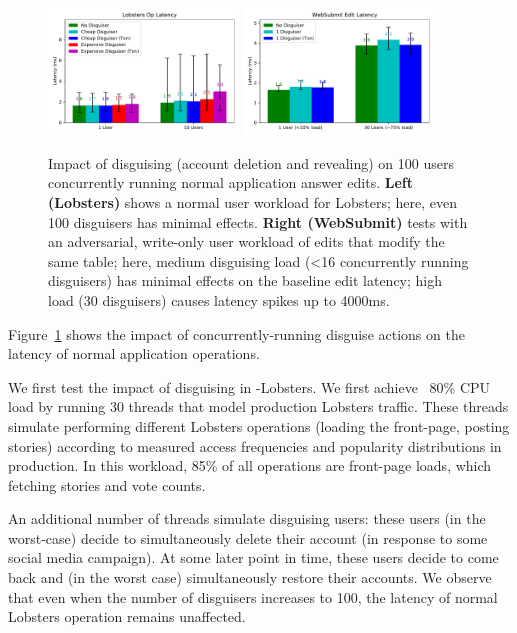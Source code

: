 \begin{figure}[t!]
    \centering
        \includegraphics[width=0.45\textwidth]{figs/lobsters_concurrent_results}
        \includegraphics[width=0.45\textwidth]{figs/websubmit_concurrent_results}
    \caption{Impact of disguising (account deletion and revealing) on 100 users concurrently running
    normal application answer edits.
    \textbf{Left (Lobsters)} shows a normal user workload for Lobsters; here, even 100 disguisers
    has minimal effects.
    \textbf{Right (WebSubmit)} tests with an adversarial,
    write-only user workload of edits that modify the same table; here, medium disguising load (<16
    concurrently running disguisers) has minimal effects on the baseline edit latency; high load (30
    disguisers) causes latency spikes up to 4000ms.
    }
    \label{fig:concurrent}
\end{figure}

Figure~\ref{fig:concurrent} shows the impact of concurrently-running disguise actions on the latency
of normal application operations.

We first test the impact of disguising in \sys-Lobsters. We first achieve ~80\% CPU load by running
30 threads that model production Lobsters traffic. These threads simulate performing different
Lobsters operations (\eg loading the front-page, posting stories) according to measured access
frequencies and popularity distributions in production. In this workload, 85\% of all
operations are front-page loads, which fetching stories and vote counts.

An additional number of threads simulate disguising users: these users (in the worst-case) decide to
simultaneously delete their account (\eg in response to some social media campaign). At some later
point in time, these users decide to come back and (in the worst case) simultaneously restore their
accounts.
We observe that even when the number of disguisers increases to 100, the latency of normal Lobsters
operation remains unaffected.


